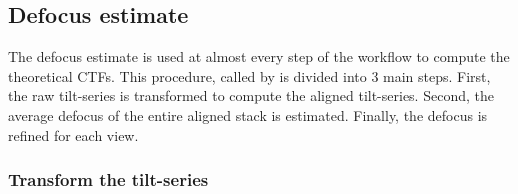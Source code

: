 \subsection{Defocus estimate} \label{sec:algo:defocus_estimate}

The defocus estimate is used at almost every step of the workflow to compute the theoretical CTFs. This procedure, called by  is divided into 3 main steps. First, the raw tilt-series is transformed to compute the aligned tilt-series. Second, the average defocus of the entire aligned stack is estimated. Finally, the defocus is refined for each view.

\subsubsection{Transform the tilt-series} \label{sec:algo:defocus_estimate:transform}

